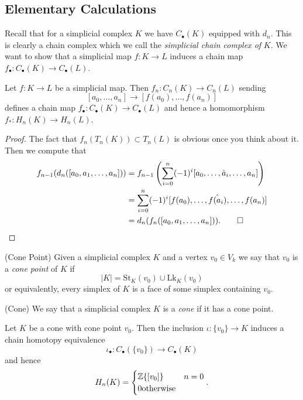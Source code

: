 \documentclass{article}
\begin{document}
\subsection{Elementary Calculations}
Recall that for a simplicial complex $ K $ we have $ C_\bullet(K) $ equipped with $ d_n $. This is clearly a chain complex which we call the \textit{simplicial chain complex of} $ K $. We want to show that a simplicial map $ f: K \to L $ induces a chain map $ f_\bullet: C_\bullet(K)\to C_\bullet(L) $.
\begin{lemma}
  Let $ f: K\to L $ be a simplicial map. Then $ f_n: C_n(K) \to C_n(L) $ sending
  \[
	  [a_0,\dots, a_n] \to [f(a_0),\dots, f(a_n)]
  \]
  defines a chain map $ f_\bullet: C_\bullet(K) \to C_\bullet(L) $ and hence a homomorphism $ f_*: H_n(K) \to H_n(L) $.
\end{lemma}
\begin{proof}
  The fact that $ f_n(T_n(K)) \subset T_n(L) $ is obvious once you think about it. Then we compute that 
  \begin{align*}
	  f_{n-1}(d_n([a_0,a_1,\dots, a_n])) &= f_{n-1}\left(\sum_{i=0}^n (-1)^i [a_0,\dots, \hat a_i, \dots, a_n]\right) \\
					     &= \sum_{i=0}^n (-1)^i [f(a_0),\dots, \hat{f(a_i)}, \dots, f(a_n)] \\
					     &= d_n(f_n([a_0,a_1,\dots, a_n])).\qed
  \end{align*}
\end{proof}
\begin{definition}
	(Cone Point) Given a simplicial complex $ K $ and a vertex $ v_0 \in V_k $ we say that $ v_0 $ is a \textit{cone point} of $ K $ if 
	\[
	|K| = \mathrm{St}_K(v_0) \cup \mathrm{Lk}_K(v_0)
	\]
	or equivalently, every simplex of $ K $ is a face of some simplex containing $ v_0 $.
\end{definition}
\begin{definition}
	(Cone) We say that a simplicial complex $ K $ is a \textit{cone} if it has a cone point.
\end{definition}
\begin{proposition}
	Let $ K $ be a cone with cone point $ v_0 $. Then the inclusion $ \iota: \{v_0\} \to K $ induces a chain homotopy equivalence
	\[
		\iota_\bullet: C_\bullet(\{v_0\}) \to C_\bullet(K)
	\]
	and hence
	\[
	  H_n(K) = \begin{cases}
		  \mathbb{Z}\{[v_0]\} &  n =0 \\
		  0 \text{otherwise}
	  \end{cases}.
	\]
\end{proposition}
\end{document}
